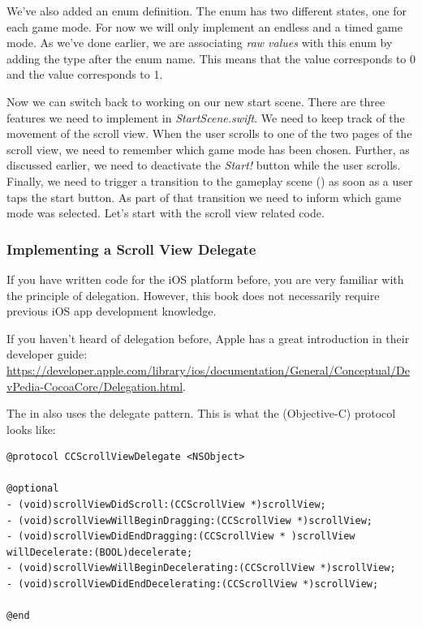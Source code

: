 We've also added an enum definition. The  enum has two
different states, one for each game mode. For now we will only implement an
endless and a timed game mode. As we've done earlier, we are associating
\textit{raw values} with this enum by adding the  type after the
enum name. This means that the  value corresponds to 0 and
the  value corresponds to 1.

Now we can switch back to working on our new start scene. There are three
features we need to implement in \textit{StartScene.swift}. We need to keep
track of the movement of the scroll view. When the user scrolls to one of the
two pages of the scroll view, we need to remember which game mode has been
chosen. Further, as discussed earlier, we need to deactivate the \textit{Start!}
button while the user scrolls. Finally, we need to trigger a transition to the
gameplay scene () as soon as a user taps the start button.
As part of that transition we need to inform  which game
mode was selected. Let's start with the scroll view related code.

\subsubsection{Implementing a Scroll View Delegate}
If you have written code for the iOS platform before, you are very familiar with
the principle of delegation. However, this book does not necessarily require
previous iOS app development knowledge.

If you haven't heard of delegation before, Apple has a great introduction in
their developer guide:
\url{https://developer.apple.com/library/ios/documentation/General/Conceptual/DevPedia-CocoaCore/Delegation.html}.

The  in \cocos{} also uses the delegate pattern. This
is what the (Objective-C) protocol looks like:
\begin{lstlisting}
@protocol CCScrollViewDelegate <NSObject>

@optional
- (void)scrollViewDidScroll:(CCScrollView *)scrollView;
- (void)scrollViewWillBeginDragging:(CCScrollView *)scrollView;
- (void)scrollViewDidEndDragging:(CCScrollView * )scrollView willDecelerate:(BOOL)decelerate;
- (void)scrollViewWillBeginDecelerating:(CCScrollView *)scrollView;
- (void)scrollViewDidEndDecelerating:(CCScrollView *)scrollView;

@end
\end{lstlisting}

